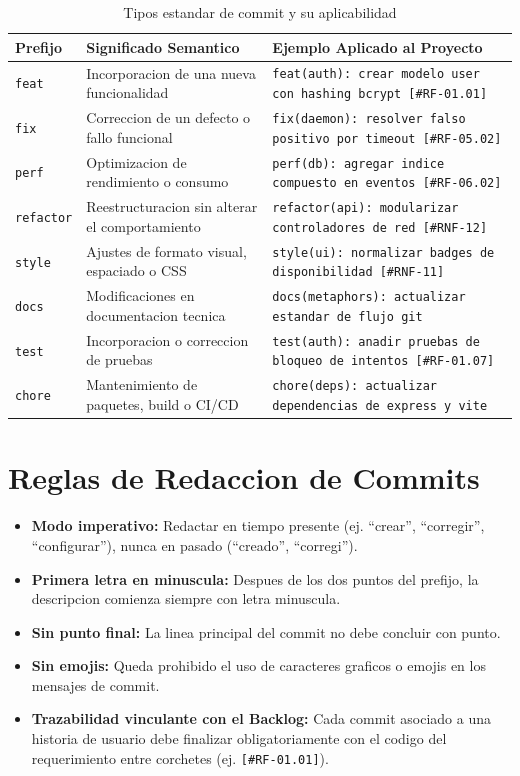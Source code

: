 \documentclass[12pt,a4paper]{report}
\begin{document}
\begin{table}[htbp]
\centering
\caption{Tipos estandar de commit y su aplicabilidad}\label{tab:commit_types}
\small
\begin{tabularx}{\textwidth}{p{2.0cm} p{4.2cm} X}
\toprule
\textbf{Prefijo} & \textbf{Significado Semantico} & \textbf{Ejemplo Aplicado al Proyecto} \\
\midrule
\texttt{feat} & Incorporacion de una nueva funcionalidad & \texttt{feat(auth): crear modelo user con hashing bcrypt [\#RF-01.01]} \\
\midrule
\texttt{fix} & Correccion de un defecto o fallo funcional & \texttt{fix(daemon): resolver falso positivo por timeout [\#RF-05.02]} \\
\midrule
\texttt{perf} & Optimizacion de rendimiento o consumo & \texttt{perf(db): agregar indice compuesto en eventos [\#RF-06.02]} \\
\midrule
\texttt{refactor} & Reestructuracion sin alterar el comportamiento & \texttt{refactor(api): modularizar controladores de red [\#RNF-12]} \\
\midrule
\texttt{style} & Ajustes de formato visual, espaciado o CSS & \texttt{style(ui): normalizar badges de disponibilidad [\#RNF-11]} \\
\midrule
\texttt{docs} & Modificaciones en documentacion tecnica & \texttt{docs(metaphors): actualizar estandar de flujo git} \\
\midrule
\texttt{test} & Incorporacion o correccion de pruebas & \texttt{test(auth): anadir pruebas de bloqueo de intentos [\#RF-01.07]} \\
\midrule
\texttt{chore} & Mantenimiento de paquetes, build o CI/CD & \texttt{chore(deps): actualizar dependencias de express y vite} \\
\bottomrule
\end{tabularx}
\end{table}

\section{Reglas de Redaccion de Commits}
\begin{itemize}
  \item \textbf{Modo imperativo:} Redactar en tiempo presente (ej. ``crear'', ``corregir'', ``configurar''), nunca en pasado (``creado'', ``corregi'').
  \item \textbf{Primera letra en minuscula:} Despues de los dos puntos del prefijo, la descripcion comienza siempre con letra minuscula.
  \item \textbf{Sin punto final:} La linea principal del commit no debe concluir con punto.
  \item \textbf{Sin emojis:} Queda prohibido el uso de caracteres graficos o emojis en los mensajes de commit.
  \item \textbf{Trazabilidad vinculante con el Backlog:} Cada commit asociado a una historia de usuario debe finalizar obligatoriamente con el codigo del requerimiento entre corchetes (ej. \texttt{[\#RF-01.01]}).
\end{itemize}
\end{document}
